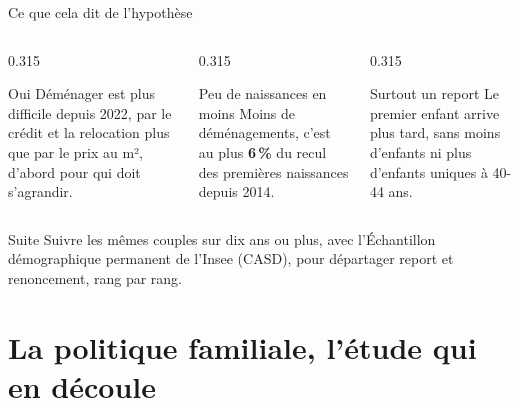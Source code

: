 \documentclass[10pt,aspectratio=169]{beamer}
\begin{document}
\begin{frame}{Ce que cela dit de l'hypothèse}
  \begin{columns}[T]
    \begin{column}{0.315\textwidth}
      \begin{callout}[tdteok]{Oui}
        \footnotesize\RaggedRight Déménager est plus difficile depuis 2022, par le crédit et la relocation plus que par le prix au m², d'abord pour qui doit s'agrandir.
      \end{callout}
    \end{column}
    \begin{column}{0.315\textwidth}
      \begin{callout}[tdtered]{Peu de naissances en moins}
        \footnotesize\RaggedRight Moins de déménagements, c'est au plus \textbf{6\,\%} du recul des premières naissances depuis 2014.
      \end{callout}
    \end{column}
    \begin{column}{0.315\textwidth}
      \begin{callout}{Surtout un report}
        \footnotesize\RaggedRight Le premier enfant arrive plus tard, sans moins d'enfants ni plus d'enfants uniques à 40-44 ans.
      \end{callout}
    \end{column}
  \end{columns}
  \vspace{0.25cm}
  \begin{callout}[tdtenavy]{Suite}
    \footnotesize Suivre les mêmes couples sur dix ans ou plus, avec l'Échantillon démographique permanent de l'Insee (CASD), pour départager report et renoncement, rang par rang.
  \end{callout}
\end{frame}

\section{La politique familiale, l'étude qui en découle}
\end{document}
